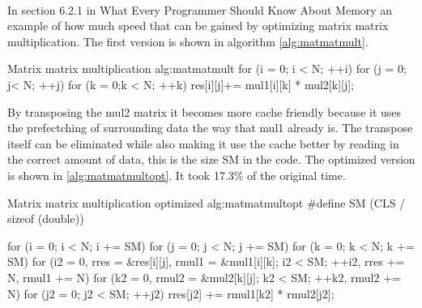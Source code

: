 \documentclass[10pt,a4paper]{report}
\newcounter{example}
\newcounter{algorithmCode}
\begin{document}
\\
In section 6.2.1 in What Every Programmer Should Know About Memory\cite{drepper2007cpumemory} an example of how much speed that can be gained by optimizing matrix matrix multiplication. The first version is shown in algorithm \ref{alg:matmatmult}.

\begin{algorithmCode}{Matrix matrix multiplication} {alg:matmatmult}
for (i = 0; i < N; ++i)
  for (j = 0; j< N; ++j)
    for (k = 0;k < N; ++k)
      res[i][j]+= mul1[i][k] * mul2[k][j];
\end{algorithmCode}

By transposing the mul2 matrix it becomes more cache friendly because it uses the prefectching of surrounding data the way that mul1 already is\cite{drepper2007cpumemory}. The transpose itself can be eliminated while also making it use the cache better by reading in the correct amount of data, this is the size SM in the code\cite{drepper2007cpumemory}. The optimized version is shown in \ref{alg:matmatmultopt}. It took 17.3\% of the original time\cite{drepper2007cpumemory}.

\begin{algorithmCode}{Matrix matrix multiplication optimized} {alg:matmatmultopt}
#define SM (CLS / sizeof (double))

for (i = 0; i < N; i += SM)
  for (j = 0; j < N; j += SM)
    for (k = 0; k < N; k += SM)
      for (i2 = 0, rres = &res[i][j], rmul1 = &mul1[i][k]; i2 < SM; ++i2, rres += N, rmul1 += N)
	for (k2 = 0, rmul2 = &mul2[k][j]; k2 < SM; ++k2, rmul2 += N)
	  for (j2 = 0; j2 < SM; ++j2)
	    rres[j2] += rmul1[k2] * rmul2[j2];
\end{algorithmCode}
\end{document}
